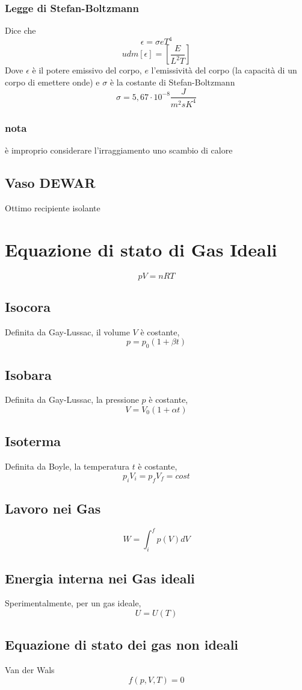 \documentclass[a4paper]{report}
\begin{document}
  \subsubsection{Legge di Stefan-Boltzmann}
  Dice che
  \[\epsilon = \sigma e T^4\]
  \[ udm[\epsilon] = [\frac{E}{L^2T}] \]
  Dove $\epsilon$ è il potere emissivo del corpo, $e$ l'emissività del corpo (la capacità di un corpo di emettere onde) e $\sigma$ è la costante di Stefan-Boltzmann
  \[ \sigma = 5,67 \cdot 10^{-8} \frac{J}{m^2sK^4} \]
  \subsubsection{nota}
  è improprio considerare l'irraggiamento uno scambio di calore
  \subsection{Vaso DEWAR}
  Ottimo recipiente isolante

  \section{Equazione di stato di Gas Ideali}
  \[ pV = nRT \]
  \subsection{Isocora}
  Definita da Gay-Lussac, il volume $V$ è costante,
  \[ p = p_0(1 + \beta t) \]
  \subsection{Isobara}
  Definita da Gay-Lussac, la pressione $p$ è costante,
  \[ V = V_0(1 + \alpha t) \]
  \subsection{Isoterma}
  Definita da Boyle, la temperatura $t$ è costante,
  \[ p_i V_i = p_f V_f = cost\]
  \subsection{Lavoro nei Gas}
  \[ W = \int_i^f p(V)dV \]
  \subsection{Energia interna nei Gas ideali}
  Sperimentalmente, per  un gas ideale,
  \[ U = U(T) \]
  \subsection{Equazione di stato dei gas non ideali}
  Van der Wals
  \[ f(p,V,T) = 0 \]
\end{document}
